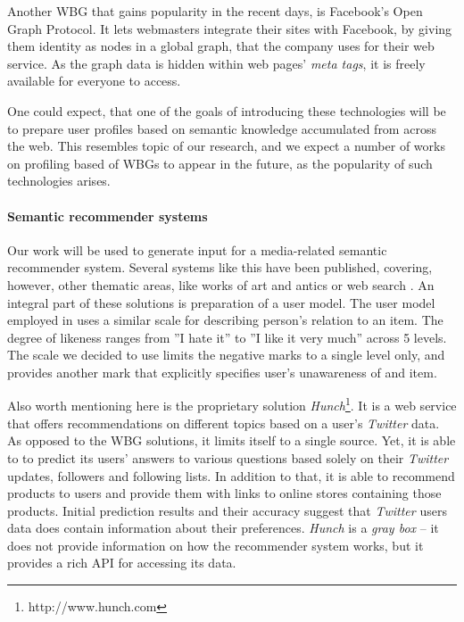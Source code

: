 Another WBG that gains popularity in the recent days, is Facebook's Open Graph
Protocol. It lets webmasters integrate their sites with Facebook, by giving them
identity as nodes in a global graph, that the company uses for their
web service. As the graph data is hidden within web pages' \textit{meta tags},
it is freely available for everyone to access.

One could expect, that one of the goals of introducing these technologies will
be to prepare user profiles based on semantic knowledge accumulated from across
the web.  This resembles topic of our research, and we expect a number of works
on profiling based of WBGs to appear in the future, as the
popularity of such technologies arises.

\paragraph{Semantic recommender systems} Our work will be used to generate input
for a media-related semantic recommender system. Several systems like this have
been published, covering, however, other thematic areas, like works of art and
antics \cite{museums} or web search \cite{social-tagging}. An integral part of
these solutions is preparation of a user model. The user model employed in
\cite{museums} uses a similar scale for describing person's relation to an item.
The degree of likeness ranges from ''I hate it'' to ''I like it very much''
across 5 levels. The scale we decided to use limits the negative marks to
a single level only, and provides another mark that explicitly specifies user's unawareness
of and item.

Also worth mentioning here is the proprietary solution
\textit{Hunch}\footnote{http://www.hunch.com}. It is a web service that offers
recommendations on different topics based on a user's \textit{Twitter} data. As
opposed to the WBG solutions, it limits itself to a single source. Yet, it is
able to to predict its users' answers to various questions based solely on their
\textit{Twitter} updates, followers and following lists.
In addition to that, it is able to recommend products
to users and provide them with links to online stores containing those products.
Initial prediction results and their accuracy suggest that
\textit{Twitter} users data does contain information about their preferences.
\textit{Hunch} is a \textit{gray box}
--  it does not provide information on how the recommender system works, but it provides a rich
API for accessing its data.
